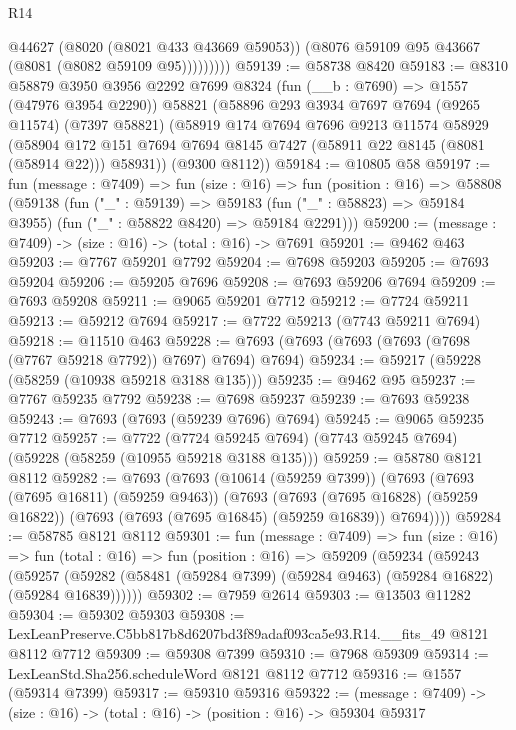 \begin{lexlean}{R14}
\begin{coremodule}
                @44627
                (@8020 (@8021 @433 @43669 @59053))
                (@8076 @59109 @95 @43667 (@8081 (@8082 @59109 @95)))))))))
@59139 := @58738 @8420
@59183 := @8310
    @58879
    @3950
    @3956
    @2292
    @7699
    @8324
    (fun (__b : @7690) => @1557 (@47976 @3954 @2290))
    @58821
    (@58896
      @293
      @3934
      @7697
      @7694
      (@9265 @11574)
      (@7397 @58821)
      (@58919
        @174
        @7694
        @7696
        @9213
        @11574
        @58929
        (@58904 @172 @151 @7694 @7694 @8145 @7427 (@58911 @22 @8145 (@8081 (@58914 @22))) @58931))
      (@9300 @8112))
@59184 := @10805 @58
@59197 := fun (message : @7409) =>
  fun (size : @16) =>
  fun (position : @16) =>
  @58808
    (@59138
      (fun ("_" : @59139) =>
      @59183 (fun ("_" : @58823) => @59184 @3955) (fun ("_" : @58822 @8420) => @59184 @2291)))
@59200 := (message : @7409) -> (size : @16) -> (total : @16) -> @7691
@59201 := @9462 @463
@59203 := @7767 @59201 @7792
@59204 := @7698 @59203
@59205 := @7693 @59204
@59206 := @59205 @7696
@59208 := @7693 @59206 @7694
@59209 := @7693 @59208
@59211 := @9065 @59201 @7712
@59212 := @7724 @59211
@59213 := @59212 @7694
@59217 := @7722 @59213 (@7743 @59211 @7694)
@59218 := @11510 @463
@59228 := @7693 (@7693 (@7693 (@7693 (@7698 (@7767 @59218 @7792)) @7697) @7694) @7694)
@59234 := @59217 (@59228 (@58259 (@10938 @59218 @3188 @135)))
@59235 := @9462 @95
@59237 := @7767 @59235 @7792
@59238 := @7698 @59237
@59239 := @7693 @59238
@59243 := @7693 (@7693 (@59239 @7696) @7694)
@59245 := @9065 @59235 @7712
@59257 := @7722
    (@7724 @59245 @7694)
    (@7743 @59245 @7694)
    (@59228 (@58259 (@10955 @59218 @3188 @135)))
@59259 := @58780 @8121 @8112
@59282 := @7693
    (@7693
      (@10614 (@59259 @7399))
      (@7693
        (@7693 (@7695 @16811) (@59259 @9463))
        (@7693
          (@7693 (@7695 @16828) (@59259 @16822))
          (@7693 (@7693 (@7695 @16845) (@59259 @16839)) @7694))))
@59284 := @58785 @8121 @8112
@59301 := fun (message : @7409) =>
  fun (size : @16) =>
  fun (total : @16) =>
  fun (position : @16) =>
  @59209
    (@59234
      (@59243
        (@59257 (@59282 (@58481 (@59284 @7399) (@59284 @9463) (@59284 @16822) (@59284 @16839))))))
@59302 := @7959 @2614
@59303 := @13503 @11282
@59304 := @59302 @59303
@59308 := LexLeanPreserve.C5bb817b8d6207bd3f89adaf093ca5e93.R14.__fits_49 @8121 @8112 @7712
@59309 := @59308 @7399
@59310 := @7968 @59309
@59314 := LexLeanStd.Sha256.scheduleWord @8121 @8112 @7712
@59316 := @1557 (@59314 @7399)
@59317 := @59310 @59316
@59322 := (message : @7409) -> (size : @16) -> (total : @16) -> (position : @16) -> @59304 @59317

\end{coremodule}
\end{lexlean}
